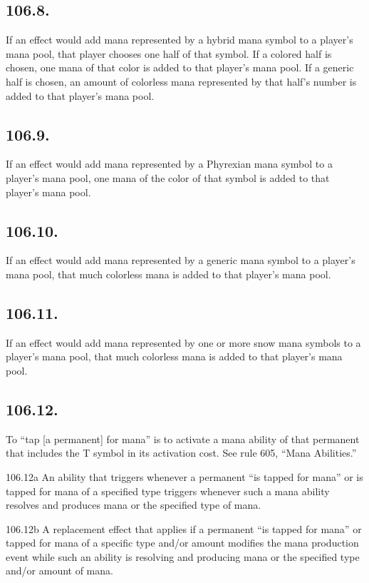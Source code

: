 \subsection*{106.8.}
If an effect would add mana represented by a hybrid mana symbol to a player’s mana pool, that player chooses one half of that symbol. If a colored half is chosen, one mana of that color is added to that player’s mana pool. If a generic half is chosen, an amount of colorless mana represented by that half’s number is added to that player’s mana pool.

\subsection*{106.9.}
If an effect would add mana represented by a Phyrexian mana symbol to a player’s mana pool, one mana of the color of that symbol is added to that player’s mana pool.

\subsection*{106.10.}
If an effect would add mana represented by a generic mana symbol to a player’s mana pool, that much colorless mana is added to that player’s mana pool.

\subsection*{106.11.}
If an effect would add mana represented by one or more snow mana symbols to a player’s mana pool, that much colorless mana is added to that player’s mana pool.

\subsection*{106.12.}
To “tap [a permanent] for mana” is to activate a mana ability of that permanent that includes the {T} symbol in its activation cost. See rule 605, “Mana Abilities.”

106.12a An ability that triggers whenever a permanent “is tapped for mana” or is tapped for mana of a specified type triggers whenever such a mana ability resolves and produces mana or the specified type of mana.

106.12b A replacement effect that applies if a permanent “is tapped for mana” or tapped for mana of a specific type and/or amount modifies the mana production event while such an ability is resolving and producing mana or the specified type and/or amount of mana.

